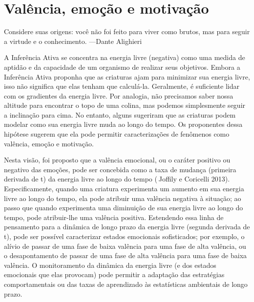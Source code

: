 \documentclass[
  12pt,
]{book}
\begin{document}
\hypertarget{valuxeancia-emouxe7uxe3o-e-motivauxe7uxe3o}{%
\section{Valência, emoção e motivação}\label{valuxeancia-emouxe7uxe3o-e-motivauxe7uxe3o}}

Considere suas origens: você não foi feito para viver como brutos, mas para seguir a virtude e o conhecimento.
---Dante Alighieri

A Inferência Ativa se concentra na energia livre (negativa) como uma medida de aptidão e da capacidade de um organismo de realizar seus objetivos. Embora a Inferência Ativa proponha que as criaturas ajam para minimizar sua energia livre, isso não significa que elas tenham que calculá-la. Geralmente, é suficiente lidar com os gradientes da energia livre. Por analogia, não precisamos saber nossa altitude para encontrar o topo de uma colina, mas podemos simplesmente seguir a inclinação para cima. No entanto, alguns sugeriram que as criaturas podem modelar como sua energia livre muda ao longo do tempo. Os proponentes dessa hipótese sugerem que ela pode permitir caracterizações de fenômenos como valência, emoção e motivação.

Nesta visão, foi proposto que a valência emocional, ou o caráter positivo ou negativo das emoções, pode ser concebida como a taxa de mudança (primeira derivada de t) da energia livre ao longo do tempo ( Joffily e Coricelli 2013). Especificamente, quando uma criatura experimenta um aumento em sua energia livre ao longo do tempo, ela pode atribuir uma valência negativa à situação; ao passo que quando experimenta uma diminuição de sua energia livre ao longo do tempo, pode atribuir-lhe uma valência positiva. Estendendo essa linha de pensamento para a dinâmica de longo prazo da energia livre (segunda derivada de t), pode ser possível caracterizar estados emocionais sofisticados; por exemplo, o alívio de passar de uma fase de baixa valência para uma fase de alta valência, ou o desapontamento de passar de uma fase de alta valência para uma fase de baixa valência. O monitoramento da dinâmica da energia livre (e dos estados emocionais que elas provocam) pode permitir a adaptação das estratégias comportamentais ou das taxas de aprendizado às estatísticas ambientais de longo prazo.
\end{document}
